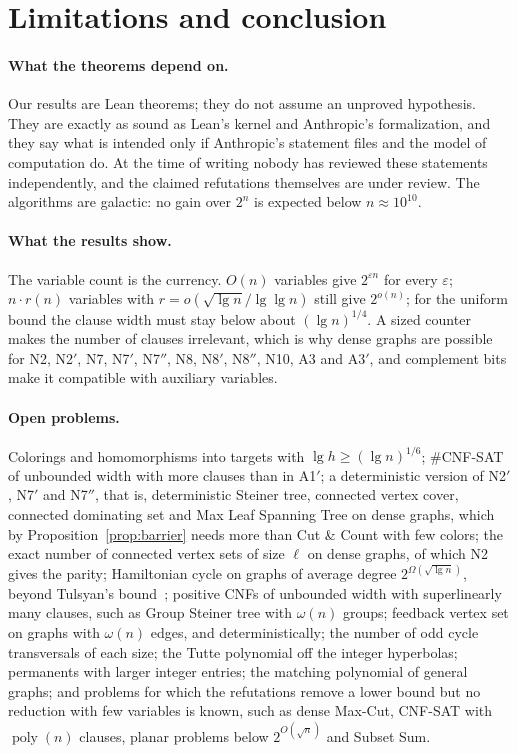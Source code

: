 \documentclass[11pt]{article}
\theoremstyle{remark}
\newcommand{\poly}{\operatorname{poly}}
\begin{document}
\section{Limitations and conclusion}\label{sec:concl}

\paragraph{What the theorems depend on.} Our results are Lean theorems; they do not assume an
unproved hypothesis. They are exactly as sound as Lean's kernel and Anthropic's formalization, and
they say what is intended only if Anthropic's statement files and the model of computation do. At
the time of writing nobody has reviewed these statements independently, and the claimed refutations
themselves are under review. The algorithms are galactic: no gain over $2^n$ is expected below
$n\approx10^{10}$.

\paragraph{What the results show.} The variable count is the currency. $O(n)$ variables give
$2^{\varepsilon n}$ for every $\varepsilon$; $n\cdot r(n)$ variables with $r=o(\sqrt{\lg n}/\lg\lg
n)$ still give $2^{o(n)}$; for the uniform bound the clause width must stay below about $(\lg
n)^{1/4}$. A sized counter makes the number of clauses irrelevant, which is why dense graphs are
possible for N2, N2$'$, N7, N7$'$, N7$''$, N8, N8$'$, N8$''$, N10, A3 and A3$'$, and complement bits make it compatible with auxiliary
variables.

\paragraph{Open problems.} Colorings and homomorphisms into targets with $\lg h\ge(\lg
n)^{1/6}$; \#CNF-SAT of unbounded width with more clauses than in A1$'$; a deterministic version of
N2$'$, N7$'$ and N7$''$, that is, deterministic Steiner tree, connected vertex cover, connected
dominating set and Max Leaf Spanning Tree on dense graphs, which by
Proposition~\ref{prop:barrier} needs more than Cut \& Count with few colors; the exact
number of connected vertex sets of size $\ell$ on dense graphs, of which N2 gives the parity;
Hamiltonian cycle on graphs of average degree $2^{\Omega(\sqrt{\lg n})}$, beyond Tulsyan's
bound~\cite{Tul26}; positive CNFs of unbounded width with superlinearly many clauses, such as Group
Steiner tree with $\omega(n)$ groups; feedback vertex set on graphs with $\omega(n)$ edges, and
deterministically; the number of odd cycle transversals of each size; the Tutte
polynomial off the integer hyperbolas; permanents with larger integer entries; the matching
polynomial of general graphs; and problems for which the refutations remove a lower bound but no
reduction with few variables is known, such as dense Max-Cut, CNF-SAT with $\poly(n)$ clauses,
planar problems below $2^{O(\sqrt n)}$ and Subset Sum.
\end{document}
